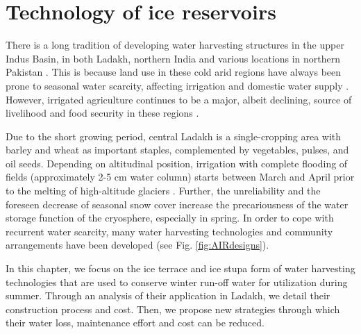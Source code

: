 \chapter{Technology of ice reservoirs}


There is a long tradition of developing water harvesting structures in the upper Indus Basin, in both Ladakh,
northern India \citep{labbalTraditionalOasesLadakh2000, nusserIrrigationDevelopmentUpper2012} and various
locations in northern Pakistan \citep{kreutzmannScarcityOpulenceWater2011}. This is because land use in these
cold arid regions have always been prone to seasonal water scarcity, affecting irrigation and domestic water
supply \citep{dameSTONGDEREVISITEDLANDUSE2010, nusserLocalKnowledgeGlobal2016}. However, irrigated agriculture
continues to be a major, albeit declining, source of livelihood and food security in these regions
\cite{dameFoodSecurityHigh2011}. 

Due to the short growing period, central Ladakh is a single-cropping area with barley and wheat as important
staples, complemented by vegetables, pulses, and oil seeds. Depending on altitudinal position, irrigation with
complete flooding of fields (approximately 2-5 cm water column) starts between March and April prior to the
melting of high-altitude glaciers \citep{nusserSociohydrologyArtificialGlaciers2019}. Further, the unreliability
and the foreseen decrease of seasonal snow cover \citep{chevuturiClimateChangeLeh2018} increase the precariousness of the water
storage function of the cryosphere, especially in spring. In order to cope with recurrent water scarcity, many
water harvesting technologies and community arrangements have been developed
\citep{nusserSociohydrologyArtificialGlaciers2019} (see Fig. \ref{fig:AIRdesigns}). 

In this chapter, we focus on the ice terrace and ice stupa form of water harvesting technologies that are used
to conserve winter run-off water for utilization during summer. Through an analysis of their application in
Ladakh, we detail their construction process and cost. Then, we propose new strategies through which their
water loss, maintenance effort and cost can be reduced.

